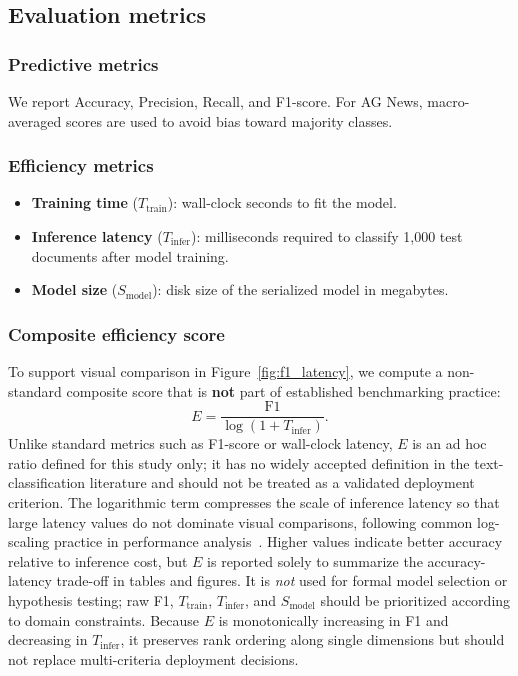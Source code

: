 \documentclass[pdflatex,sn-mathphys-num]{sn-jnl}
\begin{document}
\subsection{Evaluation metrics}

\subsubsection{Predictive metrics}
We report Accuracy, Precision, Recall, and F1-score. For AG News, macro-averaged scores are used to avoid bias toward majority classes.

\subsubsection{Efficiency metrics}
\begin{itemize}
    \item \textbf{Training time} ($T_{\text{train}}$): wall-clock seconds to fit the model.
    \item \textbf{Inference latency} ($T_{\text{infer}}$): milliseconds required to classify 1{,}000 test documents after model training.
    \item \textbf{Model size} ($S_{\text{model}}$): disk size of the serialized model in megabytes.
\end{itemize}

\subsubsection{Composite efficiency score}
To support visual comparison in Figure~\ref{fig:f1_latency}, we compute a non-standard composite score that is \textbf{not} part of established benchmarking practice:
\begin{equation}
E = \frac{\mathrm{F1}}{\log(1 + T_{\text{infer}})}.
\label{eq:efficiency}
\end{equation}
Unlike standard metrics such as F1-score or wall-clock latency, $E$ is an ad hoc ratio defined for this study only; it has no widely accepted definition in the text-classification literature and should not be treated as a validated deployment criterion. The logarithmic term compresses the scale of inference latency so that large latency values do not dominate visual comparisons, following common log-scaling practice in performance analysis~\cite{wang2024atcbench}. Higher values indicate better accuracy relative to inference cost, but $E$ is reported solely to summarize the accuracy-latency trade-off in tables and figures. It is \emph{not} used for formal model selection or hypothesis testing; raw F1, $T_{\text{train}}$, $T_{\text{infer}}$, and $S_{\text{model}}$ should be prioritized according to domain constraints. Because $E$ is monotonically increasing in F1 and decreasing in $T_{\text{infer}}$, it preserves rank ordering along single dimensions but should not replace multi-criteria deployment decisions.
\end{document}
